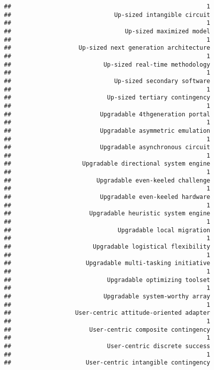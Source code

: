 \documentclass[
]{article}
\begin{document}
\begin{verbatim}
##                                                       1 
##                             Up-sized intangible circuit 
##                                                       1 
##                                Up-sized maximized model 
##                                                       1 
##                   Up-sized next generation architecture 
##                                                       1 
##                          Up-sized real-time methodology 
##                                                       1 
##                             Up-sized secondary software 
##                                                       1 
##                           Up-sized tertiary contingency 
##                                                       1 
##                         Upgradable 4thgeneration portal 
##                                                       1 
##                         Upgradable asymmetric emulation 
##                                                       1 
##                         Upgradable asynchronous circuit 
##                                                       1 
##                    Upgradable directional system engine 
##                                                       1 
##                        Upgradable even-keeled challenge 
##                                                       1 
##                         Upgradable even-keeled hardware 
##                                                       1 
##                      Upgradable heuristic system engine 
##                                                       1 
##                              Upgradable local migration 
##                                                       1 
##                       Upgradable logistical flexibility 
##                                                       1 
##                     Upgradable multi-tasking initiative 
##                                                       1 
##                           Upgradable optimizing toolset 
##                                                       1 
##                          Upgradable system-worthy array 
##                                                       1 
##                  User-centric attitude-oriented adapter 
##                                                       1 
##                      User-centric composite contingency 
##                                                       1 
##                           User-centric discrete success 
##                                                       1 
##                     User-centric intangible contingency 

\end{verbatim}
\end{document}
